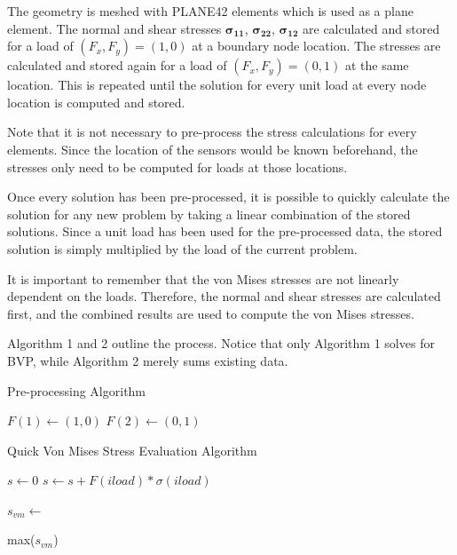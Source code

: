\documentclass[letterpaper,12pt,]{article}
\begin{document}
The geometry is meshed with PLANE42 elements which is used as a plane element. The normal and shear stresses $\boldsymbol{\sigma_{11}}$, $\boldsymbol{\sigma_{22}}$, $\boldsymbol{\sigma_{12}}$ are calculated and stored for a load of $(F_x,F_y) = (1, 0)$ at a boundary node location. The stresses are calculated and stored again for a load of $(F_x,F_y) = (0, 1)$ at the same location. This is repeated until the solution for every unit load at every node location is computed and stored.

Note that it is not necessary to pre-process the stress calculations for every elements. Since the location of the sensors would be known beforehand, the stresses only need to be computed for loads at those locations.

Once every solution has been pre-processed, it is possible to quickly calculate the solution for any new problem by taking a linear combination of the stored solutions. Since a unit load has been used for the pre-processed data, the stored solution is simply multiplied by the load of the current problem. 

It is important to remember that the von Mises stresses are not linearly dependent on the loads. Therefore, the normal and shear stresses are calculated first, and the combined results are used to compute the von Mises stresses.

Algorithm 1 and 2 outline the process. Notice that only Algorithm 1 solves for BVP, while Algorithm 2 merely sums existing data.

\begin{algorithm}
\caption{Pre-processing Algorithm}\label{pproc}
\begin{algorithmic}[1]
\State {}
\State $F(1) \gets (1,0)$
\State $F(2) \gets (0,1)$
 
  \State {}
  \State {} 
  \State {}
\EndFor
\EndFor
\end{algorithmic}
\end{algorithm}


\begin{algorithm}
\caption{Quick Von Mises Stress Evaluation Algorithm}\label{pproc}
\begin{algorithmic}[1]
\State {}
\State {}

\State $s\gets 0$
  \State $s \gets s + F(iload) * \sigma(iload)$ 
\EndFor

\State $s_{vm} \gets $ 

\State \Return max($s_{vm}$)

\end{algorithmic}
\end{algorithm}
\end{document}
